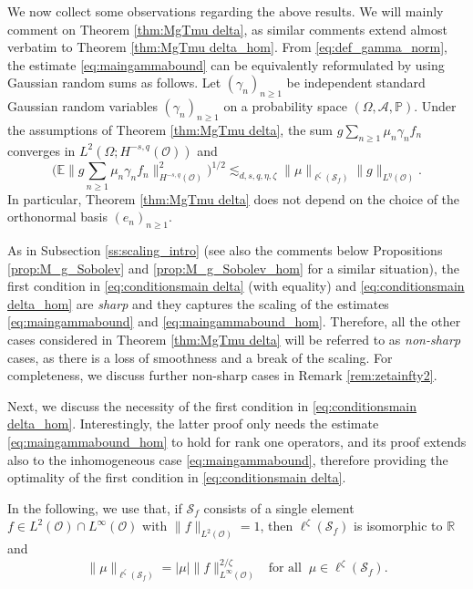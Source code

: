 \documentclass[reqno]{amsart}
\theoremstyle{plain}
\theoremstyle{remark}
\theoremstyle{plain}
\numberwithin{equation}{section}
\renewcommand\P{\mathbb{P}}
\newcommand\cO{\mathcal{O}}
\def\R{{\mathbb R}}
\newcommand{\E}{{\mathbb E}}
\renewcommand{\P}{{\mathbb P}}
\newcommand{\g}{\gamma}
\renewcommand{\O}{\Omega}
\newcommand{\Domm}{\mathcal{O}}
\newcommand{\1}{\one}
\renewcommand{\S}{\mathcal{S}}
\newcommand{\Sf}{\mathcal{S}_{f}}
\begin{document}
We now collect some observations regarding the above results. We will mainly comment on Theorem \ref{thm:MgTmu delta}, as similar comments extend almost verbatim to Theorem \ref{thm:MgTmu delta_hom}.  
%
From \eqref{eq:def_gamma_norm}, the estimate \eqref{eq:maingammabound} can be equivalently reformulated by using Gaussian random sums as follows. Let $(\g_n)_{n \geq 1}$ be independent standard Gaussian random variables $(\g_n)_{n\geq 1}$ on a probability space $(\O,\mathcal{A},\P)$. Under the assumptions of Theorem \ref{thm:MgTmu delta}, the sum $g\sum_{n\geq 1} \mu_n \g_n  f_n$ converges in $L^2(\O; H^{-s,q}(\Domm))$ and 
\begin{equation*}
\Big(\E\Big\|g \sum_{n\geq 1}  \mu_n \g_n f_n \Big\|_{H^{-s,q}(\Domm)}^2\Big)^{1/2}
\lesssim_{d,s,q,\eta,\zeta} \|\mu\|_{\ell^{\zeta}(\Sf)} \|g\|_{L^{\eta}(\mathcal{O})}.
\end{equation*}
In particular, Theorem \ref{thm:MgTmu delta} does not depend on the choice of the orthonormal basis $(e_n)_{n\geq 1}$.

As in Subsection \ref{ss:scaling_intro} (see also the comments below Propositions \ref{prop:M_g_Sobolev} and \ref{prop:M_g_Sobolev_hom} for a similar situation),
the first condition in \eqref{eq:conditionsmain delta} (with equality) and \eqref{eq:conditionsmain delta_hom}
are \emph{sharp} and they captures the scaling of the estimates \eqref{eq:maingammabound} and \eqref{eq:maingammabound_hom}.
Therefore, all the other cases considered in Theorem \ref{thm:MgTmu delta} will be referred to as \emph{non-sharp} cases, as there is a loss of smoothness and a break of the scaling. For completeness, we discuss further non-sharp cases in Remark \ref{rem:zetainfty2}.

\smallskip




Next, we discuss the necessity of the first condition in \eqref{eq:conditionsmain delta_hom}. Interestingly, the latter proof only needs the estimate \eqref{eq:maingammabound_hom} to hold for rank one operators, and its proof extends also to the inhomogeneous case \eqref{eq:maingammabound}, therefore providing the optimality of the first condition in \eqref{eq:conditionsmain delta}.

In the following, we use that, if $\S_f$ consists of a single element $f\in L^2(\cO)\cap L^\infty(\cO)$ with $\|f\|_{L^2(\cO)}=1$, then $\ell^\zeta(\S_f)$ is isomorphic to $\R$ and 
$$
\|\mu\|_{\ell^\zeta(\S_f)}= |\mu| \|f\|_{L^{\infty}(\cO)}^{2/\zeta} \ \ \text{ for all } \ \mu\in \ell^\zeta(\S_f).
$$
\end{document}
